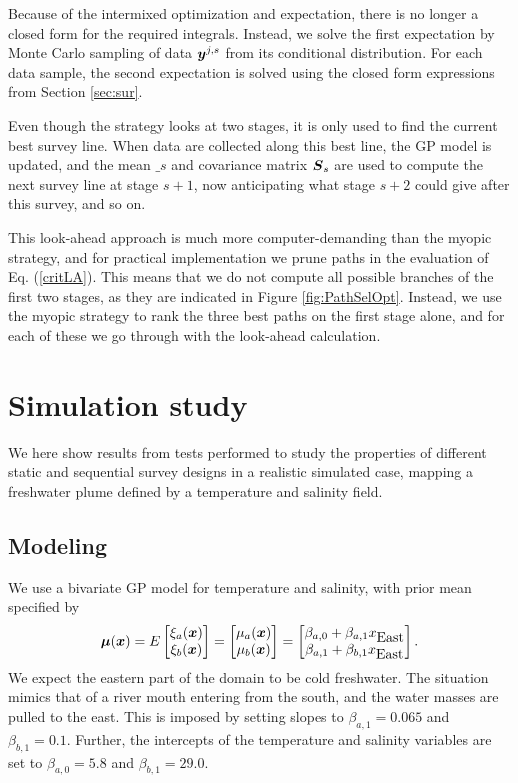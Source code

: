 \documentclass[aoas]{imsart}
\begin{document}
Because of the intermixed optimization and expectation, there is no longer a closed form for the required integrals. Instead, we solve the first expectation by Monte Carlo sampling of data ${\boldsymbol y}^{j,s}$ from its conditional distribution. For each data sample, the second expectation is solved using the closed form expressions from Section \ref{sec:sur}. 

Even though the strategy looks at two stages, it is only used to find the current best survey line. When data are collected along this best line, the GP model is updated, and the mean $\bm_{s}$ and covariance matrix ${\boldsymbol S}_{s}$ are used to compute the next survey line at stage $s+1$, now anticipating what stage $s+2$ could give after this survey, and so on. 

This look-ahead approach is much more computer-demanding than the myopic strategy, and for practical implementation we prune paths in the evaluation of Eq. (\ref{critLA}). This means that we do not compute all possible branches of the first two stages, as they are indicated in Figure \ref{fig:PathSelOpt}. Instead, we use the myopic strategy to rank the three best paths on the first stage alone, and for each of these we go through with the look-ahead calculation. 

\section{Simulation study}\label{sec:simulations}
We here show results from tests performed to study the properties of different static and sequential survey designs in a realistic simulated case, mapping a freshwater plume defined by a temperature and salinity field. 

\subsection{Modeling}

We use a bivariate GP model for temperature and salinity, with prior mean specified by
\begin{equation}\label{m}
    \bmu(\bx)=E 
    \begin{bmatrix}
    \xi_a(\bx) \\
    \xi_b(\bx) 
    \end{bmatrix}=\begin{bmatrix} \mu_{a}(\bx)\\
\mu_{b}(\bx)
\end{bmatrix} 
= \begin{bmatrix} \beta_{a,0} + \beta_{a,1} x_{\mbox{East}} \\
\beta_{a,1} + \beta_{b,1} x_{\mbox{East}}
\end{bmatrix}.
\end{equation}
We expect the eastern part of the domain to be cold freshwater. The situation mimics that of a river mouth entering from the south, and the water masses are pulled to the east. This is imposed by setting slopes to $\beta_{a,1}=0.065$ and $\beta_{b,1}=0.1$. Further, the intercepts of the temperature and salinity variables are set to $\beta_{a,0}=5.8$ and $\beta_{b,1}=29.0$. 
\end{document}
